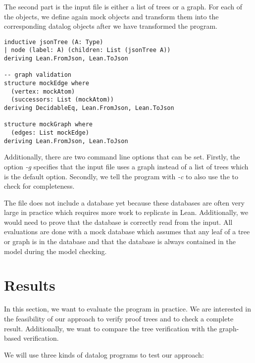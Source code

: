 The second part is the input file is either a list of trees or a graph. For each of the objects, we define again mock objects and transform them into the corresponding datalog objects after we have transformed the program.

\begin{lstlisting}
inductive jsonTree (A: Type)
| node (label: A) (children: List (jsonTree A))
deriving Lean.FromJson, Lean.ToJson

-- graph validation
structure mockEdge where
  (vertex: mockAtom)
  (successors: List (mockAtom))
deriving DecidableEq, Lean.FromJson, Lean.ToJson

structure mockGraph where
  (edges: List mockEdge)
deriving Lean.FromJson, Lean.ToJson
\end{lstlisting}

Additionally, there are two command line options that can be set. Firstly, the option \textit{-g} specifies that the input file uses a graph instead of a list of trees which is the default option. Secondly, we tell the program with \textit{-c} to also use the \modelChecker to check for completeness.

The file does not include a database yet because these databases are often very large in practice which requires more work to replicate in Lean. Additionally, we would need to prove that the database is correctly read from the input. All evaluations are done with a mock database which assumes that any leaf of a tree or graph is in the database and that the database is always contained in the model during the model checking.


\section{Results}

In this section, we want to evaluate the program in practice. We are interested in the feasibility of our approach to verify proof trees and to check a complete result. Additionally, we want to compare the tree verification with the graph-based verification.

We will use three kinds of datalog programs to test our approach:

